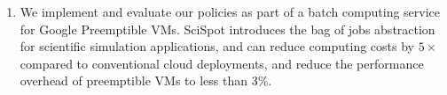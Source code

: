 \begin{enumerate} [leftmargin=12pt]
\item We implement and evaluate our policies as part of a batch computing service for Google Preemptible VMs. SciSpot introduces the bag of jobs abstraction for scientific simulation applications, and can reduce computing costs by $5\times$ compared to conventional cloud deployments, and reduce the performance overhead of preemptible VMs to less than $3\%$. 

 
\end{enumerate}



